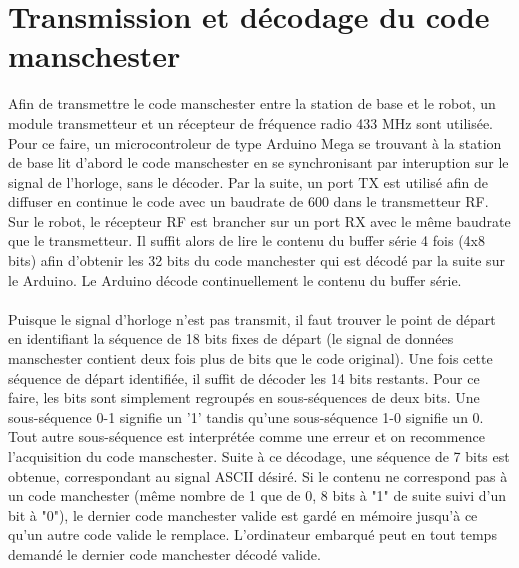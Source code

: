 \section{Transmission et décodage du code manschester}

Afin de transmettre le code manschester entre la station de base et le robot, un module transmetteur et un récepteur de fréquence radio 433 MHz sont utilisée. Pour ce faire, un microcontroleur de type Arduino Mega se trouvant à la station de base lit d'abord le code manschester en se synchronisant par interuption sur le signal de l'horloge, sans le décoder. Par la suite, un port TX est utilisé afin de diffuser en continue le code avec un baudrate de 600 dans le transmetteur RF. Sur le robot, le récepteur RF est brancher sur un port RX avec le même baudrate que le transmetteur. Il suffit alors de lire le contenu du buffer série 4 fois (4x8 bits) afin d'obtenir les 32 bits du code manchester qui est décodé par la suite sur le Arduino. Le Arduino décode continuellement le contenu du buffer série.
\paragraph{}
Puisque le signal d'horloge n'est pas transmit, il faut trouver le point de départ en identifiant la séquence de 18 bits fixes de départ (le signal de données manschester contient deux fois plus de bits que le code original). Une fois cette séquence de départ identifiée, il suffit de décoder les 14 bits restants. Pour ce faire, les bits sont simplement regroupés en sous-séquences de deux bits. Une sous-séquence 0-1 signifie un '1' tandis qu'une sous-séquence 1-0 signifie un 0. Tout autre sous-séquence est interprétée comme une erreur et on recommence l'acquisition du code manschester. Suite à ce décodage, une séquence de 7 bits est obtenue, correspondant au signal ASCII désiré. Si le contenu ne correspond pas à un code manchester (même nombre de 1 que de 0, 8 bits à "1" de suite suivi d'un bit à "0"), le dernier code manchester valide est gardé en mémoire jusqu'à ce qu'un autre code valide le remplace. L'ordinateur embarqué peut en tout temps demandé le dernier code manchester décodé valide.
